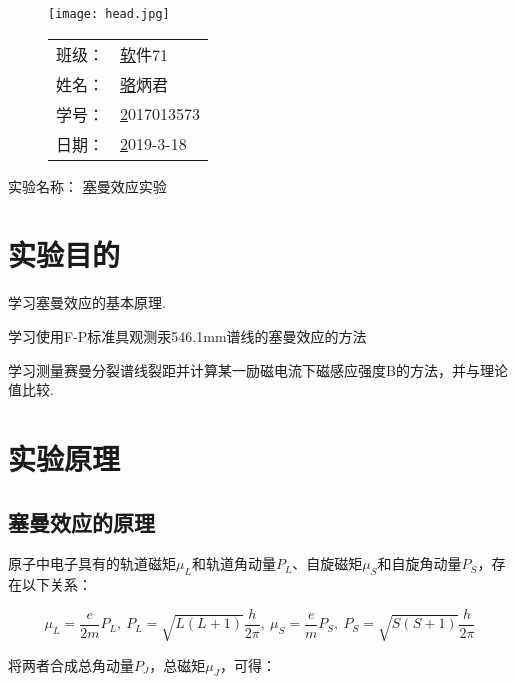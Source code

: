 \documentclass{thureport}
\newcommand{\major}{软件71}
\newcommand{\name}{骆炳君}
\newcommand{\stuid}{2017013573}
\newcommand{\newdate}{2019-3-18}
\newcommand{\newtitle}{塞曼效应实验}
\begin{document}
\thispagestyle{empty}
\begin{figure}[h]
	\begin{minipage}{0.65\linewidth}
		\centerline{\texttt{[image: head.jpg]}}
	\end{minipage}
	\hfill
	\begin{minipage}{.3\linewidth}
		\raggedleft
		\begin{tabular*}{.8\linewidth}{ll}
			班级： & \underline\major   \\
			姓名： & \underline\name    \\
			学号： & \underline\stuid   \\
			日期： & \underline\newdate
		\end{tabular*}
	\end{minipage}
\end{figure}

\begin{table}[!htbp]
	\centering\large
	实验名称： \underline\newtitle
\end{table}

\tableofcontents
\newpage

\section{实验目的}
\begin{clause}
	\item 学习塞曼效应的基本原理.
	\item 学习使用F-P标准具观测汞546.1mm谱线的塞曼效应的方法
	\item 学习测量赛曼分裂谱线裂距并计算某一励磁电流下磁感应强度B的方法，并与理论值比较.
\end{clause}

\section{实验原理}
\subsection{塞曼效应的原理}
原子中电子具有的轨道磁矩$\mu_L$和轨道角动量$P_L$、自旋磁矩$\mu_S$和自旋角动量$P_S$，存在以下关系：

$$\mu_L=\frac{e}{2m}P_L,\ P_L=\sqrt{L(L+1)}\frac{h}{2\pi},\ \mu_S=\frac{e}{m}P_S,\ P_S=\sqrt{S(S+1)}\frac{h}{2\pi}$$

将两者合成总角动量$P_J$，总磁矩$\mu_J$，可得：
\end{document}

